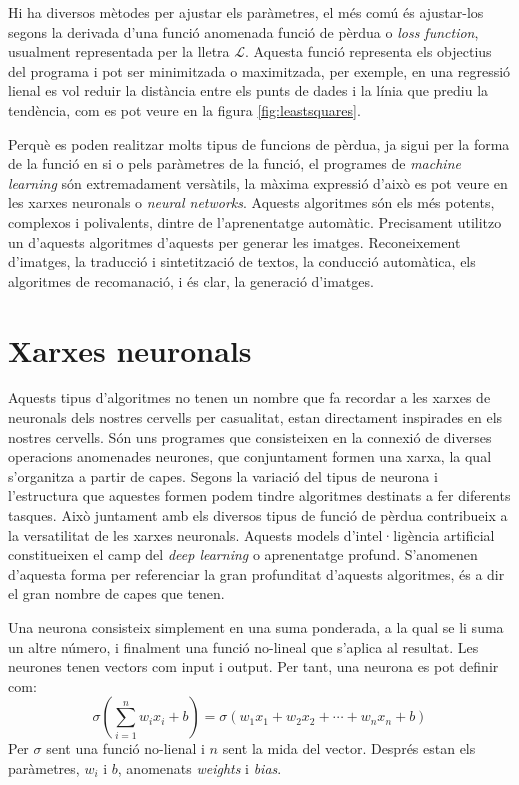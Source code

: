 Hi ha diversos mètodes per ajustar els paràmetres, el més comú és ajustar-los segons la derivada d'una funció anomenada funció de pèrdua o \textit{loss function}, usualment representada per la lletra $\mathcal{L}$. Aquesta funció representa els objectius del programa i pot ser minimitzada o maximitzada, per exemple, en una regressió lienal es vol reduir la distància entre els punts de dades i la línia que prediu la tendència, com es pot veure en la figura \ref{fig:leastsquares}.

Perquè es poden realitzar molts tipus de funcions de pèrdua, ja sigui per la forma de la funció en si o pels paràmetres de la funció, el programes de \textit{machine learning} són extremadament versàtils, la màxima expressió d'això es pot veure en les xarxes neuronals o \textit{neural networks}. Aquests algoritmes són els més potents, complexos i polivalents, dintre de l'aprenentatge automàtic. Precisament utilitzo un d'aquests algoritmes d'aquests per generar les imatges. Reconeixement d'imatges, la traducció i sintetització de textos, la conducció automàtica, els algoritmes de recomanació, i és clar, la generació d'imatges.

\section{Xarxes neuronals}
Aquests tipus d'algoritmes no tenen un nombre que fa recordar a les xarxes de neuronals dels nostres cervells per casualitat, estan directament inspirades en els nostres cervells. Són uns programes que consisteixen en la connexió de diverses operacions anomenades neurones, que conjuntament formen una xarxa, la qual s'organitza a partir de capes. Segons la variació del tipus de neurona i l'estructura que aquestes formen podem tindre algoritmes destinats a fer diferents tasques. Això juntament amb els diversos tipus de funció de pèrdua contribueix a la versatilitat de les xarxes neuronals. Aquests models d'intel·ligència artificial constitueixen el camp del \textit{deep learning} o aprenentatge profund. S'anomenen d'aquesta forma per referenciar la gran profunditat d'aquests algoritmes, és a dir el gran nombre de capes que tenen.

Una neurona consisteix simplement en una suma ponderada, a la qual se li suma un altre número, i finalment una funció no-lineal que s'aplica al resultat. Les neurones tenen vectors com input i output. Per tant, una neurona es pot definir com:
$$
\sigma \left(\sum_{i=1}^n w_i x_i + b\right) = \sigma \left( w_1x_1 + w_2x_2 + \cdots + w_nx_n + b 
\right) 
$$
Per $\sigma$ sent una funció no-lienal i $n$ sent la mida del vector. Després estan els paràmetres, $w_i$ i $b$, anomenats \textit{weights} i \textit{bias}.

